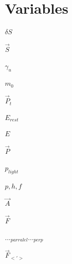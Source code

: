 \section*{Variables}

$\delta S$ \newline

$\vec{S}$ \newline

$\gamma_u$ \newline

$m_0$ \newline

$\vec{P}_t$ \newline

$E_{rest}$ \newline

$E$ \newline

$\vec{P}$ \newline

$p_{light}$ \newline

$p, h, f$ \newline

$\vec{A}$ \newline

$\vec{F}$ \newline

$..._{parralel} ..._{perp}$ \newline

$\vec{F}_{<'>}$ \newline



